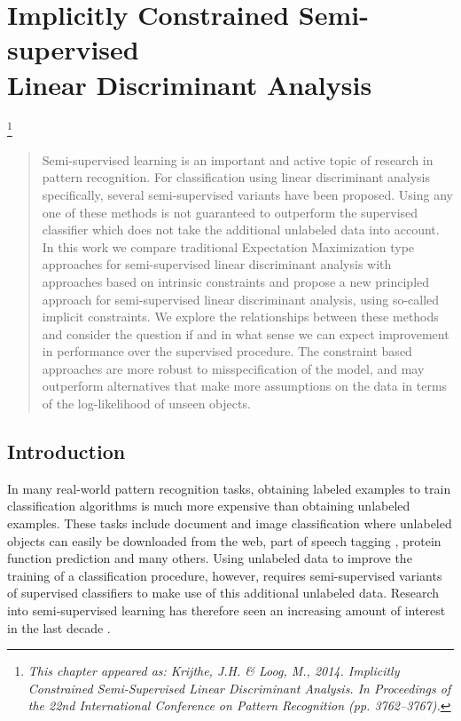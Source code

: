\documentclass[twoside]{memoir}\usepackage[]{graphicx}\usepackage{xcolor}
\renewcommand{\cite}{\citep}
\newcommand\blfootnote[1]{%
  \begingroup
  \renewcommand\thefootnote{}\footnote{\itshape#1}%
  \addtocounter{footnote}{-1}%
  \endgroup
}
\begin{document}
\chapter[Implicitly Constrained Semi-supervised Linear Discriminant Analysis]{Implicitly Constrained Semi-supervised\\Linear Discriminant Analysis}
\label{chapter:iclda}
\blfootnote{This chapter appeared as: Krijthe, J.H. \& Loog, M., 2014. Implicitly Constrained Semi-Supervised Linear Discriminant Analysis. In Proceedings of the 22nd International Conference on Pattern Recognition (pp. 3762–3767).}


\begin{abstract}
Semi-supervised learning is an important and active topic of research in pattern recognition. For classification using linear discriminant analysis specifically, several semi-supervised variants have been proposed. Using any one of these methods is not guaranteed to outperform the supervised classifier which does not take the additional unlabeled data into account. In this work we compare traditional Expectation Maximization type approaches for semi-supervised linear discriminant analysis with approaches based on intrinsic constraints and propose a new principled approach for semi-supervised linear discriminant analysis, using so-called implicit constraints. We explore the relationships between these methods and consider the question if and in what sense we can expect improvement in performance over the supervised procedure. The constraint based approaches are more robust to misspecification of the model, and may outperform alternatives that make more assumptions on the data in terms of the log-likelihood of unseen objects.
\end{abstract}

\section{Introduction}
In many real-world pattern recognition tasks, obtaining labeled examples to train classification algorithms is much more expensive than obtaining unlabeled examples. These tasks include document and image classification \cite{Nigam2000} where unlabeled objects can easily be downloaded from the web, part of speech tagging \cite{Elworthy1994}, protein function prediction \cite{Weston2005} and many others. Using unlabeled data to improve the training of a classification procedure, however, requires semi-supervised variants of supervised classifiers to make use of this additional unlabeled data. Research into semi-supervised learning has therefore seen an increasing amount of interest in the last decade \cite{Chapelle2006}.
\end{document}
